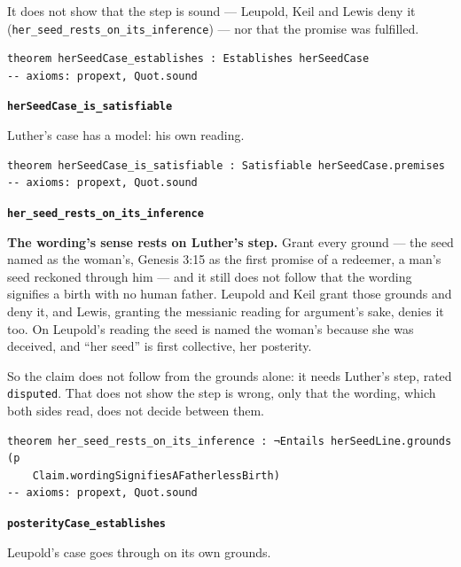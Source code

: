 \documentclass[11pt]{article}
\begin{document}
It does not show that the step is sound — Leupold, Keil and Lewis deny it (\texttt{her\_\allowbreak{}seed\_\allowbreak{}rests\_\allowbreak{}on\_\allowbreak{}its\_\allowbreak{}inference}) — nor that the promise was fulfilled.

{\small\begin{verbatim}
theorem herSeedCase_establishes : Establishes herSeedCase
-- axioms: propext, Quot.sound
\end{verbatim}}
\par\medskip\noindent\textbf{\texttt{her\allowbreak{}Seed\allowbreak{}Case\_\allowbreak{}is\_\allowbreak{}satisfiable}}\par\nobreak\noindent
Luther’s case has a model: his own reading.

{\small\begin{verbatim}
theorem herSeedCase_is_satisfiable : Satisfiable herSeedCase.premises
-- axioms: propext, Quot.sound
\end{verbatim}}
\par\medskip\noindent\textbf{\texttt{her\_\allowbreak{}seed\_\allowbreak{}rests\_\allowbreak{}on\_\allowbreak{}its\_\allowbreak{}inference}}\par\nobreak\noindent
\textbf{The wording’s sense rests on Luther’s step.} Grant every ground — the seed named as the woman’s, Genesis 3:15 as the first promise of a redeemer, a man’s seed reckoned through him — and it still does not follow that the wording signifies a birth with no human father. Leupold and Keil grant those grounds and deny it, and Lewis, granting the messianic reading for argument’s sake, denies it too. On Leupold’s reading the seed is named the woman’s because she was deceived, and “her seed” is first collective, her posterity.

So the claim does not follow from the grounds alone: it needs Luther’s step, rated \texttt{disputed}. That does not show the step is wrong, only that the wording, which both sides read, does not decide between them.

{\small\begin{verbatim}
theorem her_seed_rests_on_its_inference : ¬Entails herSeedLine.grounds (p
    Claim.wordingSignifiesAFatherlessBirth)
-- axioms: propext, Quot.sound
\end{verbatim}}
\par\medskip\noindent\textbf{\texttt{posterity\allowbreak{}Case\_\allowbreak{}establishes}}\par\nobreak\noindent
Leupold’s case goes through on its own grounds.
\end{document}
